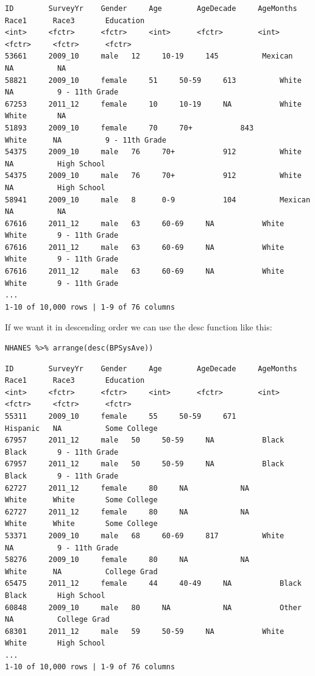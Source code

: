 \documentclass[
]{article}
\begin{document}
\begin{verbatim}
ID        SurveyYr    Gender     Age        AgeDecade     AgeMonths    Race1      Race3       Education
<int>     <fctr>      <fctr>     <int>      <fctr>        <int>        <fctr>     <fctr>      <fctr>
53661     2009_10     male   12     10-19     145          Mexican    NA          NA    
58821     2009_10     female     51     50-59     613          White      NA          9 - 11th Grade    
67253     2011_12     female     10     10-19     NA           White      White       NA    
51893     2009_10     female     70     70+           843          White      NA          9 - 11th Grade    
54375     2009_10     male   76     70+           912          White      NA          High School   
54375     2009_10     male   76     70+           912          White      NA          High School   
58941     2009_10     male   8      0-9           104          Mexican    NA          NA    
67616     2011_12     male   63     60-69     NA           White      White       9 - 11th Grade    
67616     2011_12     male   63     60-69     NA           White      White       9 - 11th Grade    
67616     2011_12     male   63     60-69     NA           White      White       9 - 11th Grade    
...
1-10 of 10,000 rows | 1-9 of 76 columns
\end{verbatim}

If we want it in descending order we can use the desc function like
this:

\begin{verbatim}
NHANES %>% arrange(desc(BPSysAve))
\end{verbatim}

\begin{verbatim}
ID        SurveyYr    Gender     Age        AgeDecade     AgeMonths    Race1      Race3       Education
<int>     <fctr>      <fctr>     <int>      <fctr>        <int>        <fctr>     <fctr>      <fctr>
55311     2009_10     female     55     50-59     671          Hispanic   NA          Some College  
67957     2011_12     male   50     50-59     NA           Black      Black       9 - 11th Grade    
67957     2011_12     male   50     50-59     NA           Black      Black       9 - 11th Grade    
62727     2011_12     female     80     NA            NA           White      White       Some College  
62727     2011_12     female     80     NA            NA           White      White       Some College  
53371     2009_10     male   68     60-69     817          White      NA          9 - 11th Grade    
58276     2009_10     female     80     NA            NA           White      NA          College Grad  
65475     2011_12     female     44     40-49     NA           Black      Black       High School   
60848     2009_10     male   80     NA            NA           Other      NA          College Grad  
68301     2011_12     male   59     50-59     NA           White      White       High School   
...
1-10 of 10,000 rows | 1-9 of 76 columns
\end{verbatim}
\end{document}
